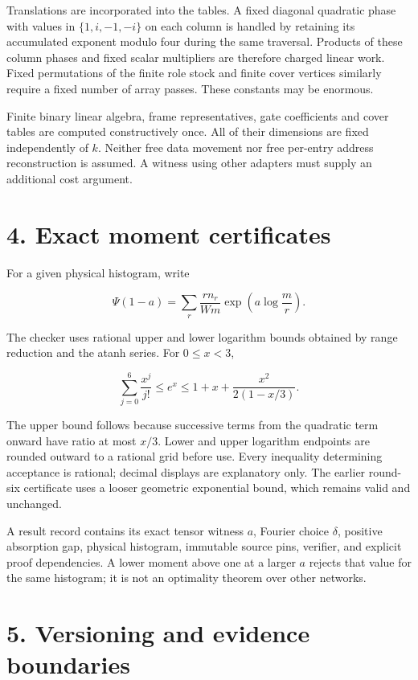 \documentclass[
  11pt,
]{article}
\begin{document}
Translations are incorporated into the tables. A fixed diagonal
quadratic phase with values in \(\{1,i,-1,-i\}\) on each column is
handled by retaining its accumulated exponent modulo four during the
same traversal. Products of these column phases and fixed scalar
multipliers are therefore charged linear work. Fixed permutations of the
finite role stock and finite cover vertices similarly require a fixed
number of array passes. These constants may be enormous.

Finite binary linear algebra, frame representatives, gate coefficients
and cover tables are computed constructively once. All of their
dimensions are fixed independently of \(k\). Neither free data movement
nor free per-entry address reconstruction is assumed. A witness using
other adapters must supply an additional cost argument.

\section{4. Exact moment certificates}\label{exact-moment-certificates}

For a given physical histogram, write

\[\Psi(1-a)=\sum_r\frac{rn_r}{Wm}
\exp\!\left(a\log\frac mr\right).\]

The checker uses rational upper and lower logarithm bounds obtained by
range reduction and the atanh series. For \(0\le x<3\),

\[\sum_{j=0}^{6}\frac{x^j}{j!}\le e^x
\le1+x+\frac{x^2}{2(1-x/3)}.
\tag{4.1}\]

The upper bound follows because successive terms from the quadratic term
onward have ratio at most \(x/3\). Lower and upper logarithm endpoints
are rounded outward to a rational grid before use. Every inequality
determining acceptance is rational; decimal displays are explanatory
only. The earlier round-six certificate uses a looser geometric
exponential bound, which remains valid and unchanged.

A result record contains its exact tensor witness \(a\), Fourier choice
\(\delta\), positive absorption gap, physical histogram, immutable
source pins, verifier, and explicit proof dependencies. A lower moment
above one at a larger \(a\) rejects that value for the same histogram;
it is not an optimality theorem over other networks.

\section{5. Versioning and evidence
boundaries}\label{versioning-and-evidence-boundaries}
\end{document}
